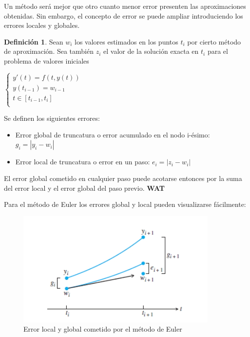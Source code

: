 \documentclass{article}
\theoremstyle{theorem-style}  %
\theoremstyle{definition}
\newtheorem{definition}{Definición}[section]
\theoremstyle{example-style}
\begin{document}
	Un método será mejor que otro cuanto menor error presenten las aproximaciones obtenidas. Sin embargo, el concepto de error se puede ampliar introduciendo los errores locales y globales.
	
	\begin{definition} 
		Sean $w_i$ los valores estimados en los puntos $t_i$ por cierto método de aproximación. Sea también $z_i$ el valor de la solución exacta en $t_i$ para el problema de valores iniciales
		
		\begin{center}
			$\begin{cases}
			y'(t) = f(t,y(t)) \\
			y(t_{i-1}) = w_{i-1} \\
			t \in [t_{i-1},t_{i}] \\
			\end{cases}$
		\end{center}

		Se definen los siguientes errores:
	
		\begin{itemize}
			\item Error global de truncatura o error acumulado en el nodo i-ésimo: $g_i=|y_i - w_i|$
			\item Error local de truncatura o error en un paso: $e_i = |z_i - w_i|$
		\end{itemize} 
	\end{definition}
	
	El error global cometido en cualquier paso puede acotarse entonces por la suma del error local y el error global del paso previo. \textbf{WAT}
	
	Para el método de Euler los errores global y local pueden visualizarse fácilmente:
	
	\begin{figure}[h]
	\centering
	\includegraphics[width=10cm]{./Images/error-euler.png}
	\caption{Error local y global cometido por el método de Euler} 
	\label{fig:error-euler}
	\end{figure}
	
\end{document}
